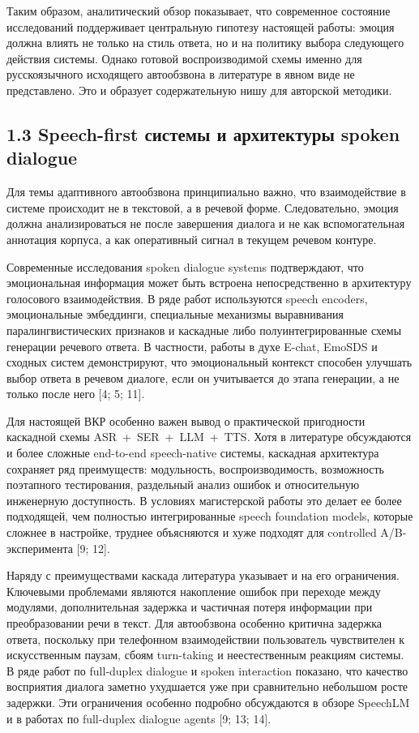 \documentclass[a4paper,14pt]{extarticle}
\renewcommand{\texttt}[1]{\textnormal{#1}}
\begin{document}
Таким образом, аналитический обзор показывает, что современное состояние
исследований поддерживает центральную гипотезу настоящей работы: эмоция
должна влиять не только на стиль ответа, но и на политику выбора
следующего действия системы. Однако готовой воспроизводимой схемы именно
для русскоязычного исходящего автообзвона в литературе в явном виде не
представлено. Это и образует содержательную нишу для авторской методики.

\subsection{1.3 Speech-first системы и архитектуры spoken
dialogue}\label{speech-first-ux441ux438ux441ux442ux435ux43cux44b-ux438-ux430ux440ux445ux438ux442ux435ux43aux442ux443ux440ux44b-spoken-dialogue}

Для темы адаптивного автообзвона принципиально важно, что взаимодействие
в системе происходит не в текстовой, а в речевой форме. Следовательно,
эмоция должна анализироваться не после завершения диалога и не как
вспомогательная аннотация корпуса, а как оперативный сигнал в текущем
речевом контуре.

Современные исследования spoken dialogue systems подтверждают, что
эмоциональная информация может быть встроена непосредственно в
архитектуру голосового взаимодействия. В ряде работ используются speech
encoders, эмоциональные эмбеддинги, специальные механизмы выравнивания
паралингвистических признаков и каскадные либо полуинтегрированные схемы
генерации речевого ответа. В частности, работы в духе E-chat, EmoSDS и
сходных систем демонстрируют, что эмоциональный контекст способен
улучшать выбор ответа в речевом диалоге, если он учитывается до этапа
генерации, а не только после него {[}4; 5; 11{]}.

Для настоящей ВКР особенно важен вывод о практической пригодности
каскадной схемы \texttt{ASR\ +\ SER\ +\ LLM\ +\ TTS}. Хотя в литературе
обсуждаются и более сложные end-to-end speech-native системы, каскадная
архитектура сохраняет ряд преимуществ: модульность, воспроизводимость,
возможность поэтапного тестирования, раздельный анализ ошибок и
относительную инженерную доступность. В условиях магистерской работы это
делает ее более подходящей, чем полностью интегрированные speech
foundation models, которые сложнее в настройке, труднее объясняются и
хуже подходят для controlled A/B-эксперимента {[}9; 12{]}.

Наряду с преимуществами каскада литература указывает и на его
ограничения. Ключевыми проблемами являются накопление ошибок при
переходе между модулями, дополнительная задержка и частичная потеря
информации при преобразовании речи в текст. Для автообзвона особенно
критична задержка ответа, поскольку при телефонном взаимодействии
пользователь чувствителен к искусственным паузам, сбоям turn-taking и
неестественным реакциям системы. В ряде работ по full-duplex dialogue и
spoken interaction показано, что качество восприятия диалога заметно
ухудшается уже при сравнительно небольшом росте задержки. Эти
ограничения особенно подробно обсуждаются в обзоре SpeechLM и в работах
по full-duplex dialogue agents {[}9; 13; 14{]}.
\end{document}
